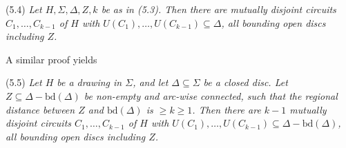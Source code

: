 \stmt
(5.4) \textit{Let $H, \Sigma, \Delta, Z, k$ be as in (5.3). Then there are mutually disjoint circuits $C_1, \dots, C_{k-1}$ of $H$ with $U(C_1), \dots, U(C_{k-1}) \subseteq \Delta$, all bounding open discs including $Z$.}

A similar proof  yields

\stmt
(5.5) \textit{Let $H$ be a drawing in $\Sigma$, and let $\Delta \subseteq \Sigma$ be a closed disc. Let $Z \subseteq \Delta - \text{bd}(\Delta)$ be non-empty and arc-wise connected, such that the regional distance between $Z$ and $\text{bd}(\Delta)$ is $\ge k \ge 1$. Then there are $k - 1$ mutually disjoint circuits $C_1, \dots, C_{k-1}$ of $H$ with $U(C_1), \dots, U(C_{k-1}) \subseteq \Delta - \text{bd}(\Delta)$, all bounding open discs including $Z$.}

